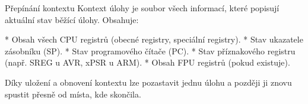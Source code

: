 \chap Přepínání kontextu
Kontext úlohy je soubor všech informací, které popisují aktuální stav běžící úlohy. Obsahuje:

\begitems 
* Obsah všech CPU registrů (obecné registry, speciální registry).
* Stav ukazatele zásobníku (SP).
* Stav programového čítače (PC).
* Stav příznakového registru (např. SREG u AVR, xPSR u ARM).
* Obsah FPU registrů (pokud existuje).
\enditems

Díky uložení a obnovení kontextu lze pozastavit jednu úlohu a později ji znovu spustit přesně od místa, kde skončila.
